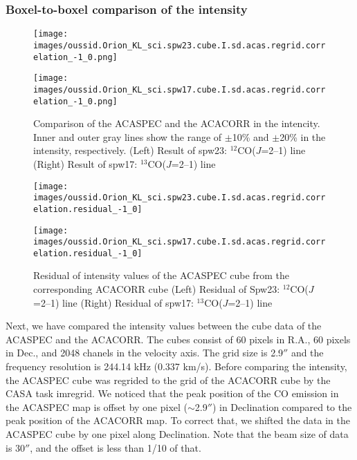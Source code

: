 \newpage
\subsubsection{Boxel-to-boxel comparison of the intensity}

\begin{figure}[htbp]
  \begin{minipage}[b]{0.48\linewidth}
    \centering
    \texttt{[image: images/oussid.Orion\_KL\_sci.spw23.cube.I.sd.acas.regrid.correlation\_-1\_0.png]}
  \end{minipage}
  \begin{minipage}[b]{0.48\linewidth}
    \centering
    \texttt{[image: images/oussid.Orion\_KL\_sci.spw17.cube.I.sd.acas.regrid.correlation\_-1\_0.png]}
  \end{minipage}
    \caption{Comparison of the ACASPEC and the ACACORR in the intencity. Inner and outer gray lines show the range of $\pm$10\% and $\pm$20\% in the intensity, respectively. (Left) Result of spw23: $^{12}$CO($J$=2--1) line (Right) Result of spw17: $^{13}$CO($J$=2--1) line}
    \label{fig:intensity}
\end{figure}

\begin{figure}[htbp]
  \begin{minipage}[b]{0.48\linewidth}
    \centering
    \texttt{[image: images/oussid.Orion\_KL\_sci.spw23.cube.I.sd.acas.regrid.correlation.residual\_-1\_0]}
  \end{minipage}
  \begin{minipage}[b]{0.48\linewidth}
    \centering
    \texttt{[image: images/oussid.Orion\_KL\_sci.spw17.cube.I.sd.acas.regrid.correlation.residual\_-1\_0]}
  \end{minipage}
    \caption{Residual of intensity values of the ACASPEC cube from the corresponding ACACORR cube (Left) Residual of Spw23: $^{12}$CO($J$=2--1) line (Right) Residual of spw17: $^{13}$CO($J$=2--1) line}
    \label{fig:intensity_residual}
\end{figure}



Next, we have compared the intensity values between the cube data of the ACASPEC and the ACACORR. 
The cubes consist of 60 pixels in R.A., 60 pixels in Dec., and 2048 chanels in the velocity axis.
The grid size is 2.9$''$ and the frequency resolution is 244.14 kHz (0.337 km/s). 
Before comparing the intensity, the ACASPEC cube was regrided to the grid of the ACACORR cube by the CASA task imregrid. We noticed that the peak position of the CO emission in the ACASPEC map is offset by one pixel ($\sim$2.9$''$) in Declination compared to the peak position of the ACACORR map. To correct that, we shifted the data in the ACASPEC cube by one pixel along Declination. Note that the beam size of data is 30$''$, and the offset is less than 1/10 of that.

